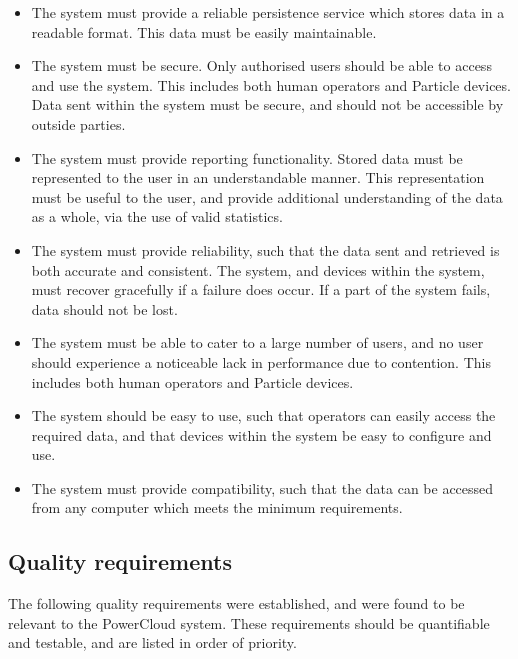 \documentclass{article}
\begin{document}
	\begin{itemize}
		\item The system must provide a reliable persistence service 
		which stores data in a readable format. This data must be easily 
		maintainable.
		\item The system must be secure. Only authorised users should be 
		able to access and use the system. This includes both human 
		operators and Particle devices. Data sent within the system must 
		be secure, and should not be accessible by outside parties.
		\item The system must provide reporting functionality. Stored 
		data must be represented to the user in an understandable manner. 
		This representation must be useful to the user, and provide 
		additional understanding of the data as a whole, via the use of 
		valid statistics.
		\item The system must provide reliability, such that the data 
		sent and retrieved is both accurate and consistent. The system, 
		and devices within the system, must recover gracefully if a 
		failure does occur. If a part of the system fails, data should 
		not be lost.
		\item The system must be able to cater to a large number of 
		users, and no user should experience a noticeable lack in 
		performance due to contention. This includes both human operators 
		and Particle devices.
		\item The system should be easy to use, such that operators can 
		easily access the required data, and that devices within the 
		system be easy to configure and use.
		\item The system must provide compatibility, such that the data 
		can be accessed from any computer which meets the minimum 
		requirements.
	\end{itemize}
	
	\newpage

	\subsection{Quality requirements}
	
	The following quality requirements were established, and were found 
	to be relevant to the PowerCloud system. These requirements should be 
	quantifiable and testable, and are listed in order of priority.
	
\end{document}
